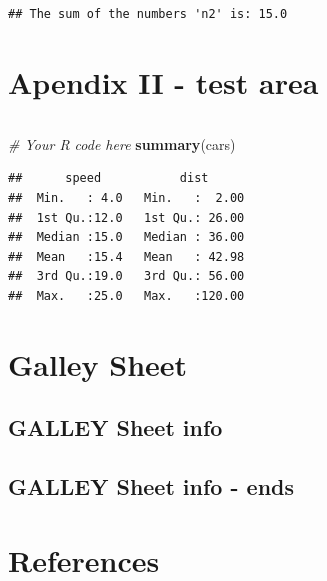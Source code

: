 \documentclass[
  12 pt,
  a4paper,
]{book}
\newenvironment{Shaded}{\begin{snugshade}}{\end{snugshade}}
\newcommand{\CommentTok}[1]{\textcolor[rgb]{0.56,0.35,0.01}{\textit{#1}}}
\newcommand{\FunctionTok}[1]{\textcolor[rgb]{0.13,0.29,0.53}{\textbf{#1}}}
\newcommand{\NormalTok}[1]{#1}
\numberwithin{equation}{section}
\theoremstyle{plain}      %
\theoremstyle{definition} %
\theoremstyle{remark}     %
\theoremstyle{note}         %
\begin{document}
\begin{verbatim}
## The sum of the numbers 'n2' is: 15.0
\end{verbatim}

\newpage

\hypertarget{apendix-ii---test-area}{%
\chapter{Apendix II - test area}\label{apendix-ii---test-area}}

\renewcommand{\lstlistlistingname}{Code Block Listings}

\begin{lstlisting}[caption={Test Code Block Listing}, label={lst:Tst_Listing}]
\end{lstlisting}
\scriptsize

\begin{Shaded}
\begin{Highlighting}[]
\CommentTok{\# Your R code here}
\FunctionTok{summary}\NormalTok{(cars)}
\end{Highlighting}
\end{Shaded}

\begin{verbatim}
##      speed           dist       
##  Min.   : 4.0   Min.   :  2.00  
##  1st Qu.:12.0   1st Qu.: 26.00  
##  Median :15.0   Median : 36.00  
##  Mean   :15.4   Mean   : 42.98  
##  3rd Qu.:19.0   3rd Qu.: 56.00  
##  Max.   :25.0   Max.   :120.00
\end{verbatim}

\normalsize

\listoffigures

\lstlistoflistings

\hypertarget{galley-sheet}{%
\chapter*{Galley Sheet}\label{galley-sheet}}

\hypertarget{galley-sheet-info}{%
\section{\texorpdfstring{\textbf{GALLEY Sheet
info}}{GALLEY Sheet info}}\label{galley-sheet-info}}

\layout

\hypertarget{galley-sheet-info---ends}{%
\section{\texorpdfstring{\textbf{GALLEY Sheet info -
ends}}{GALLEY Sheet info - ends}}\label{galley-sheet-info---ends}}

\newpage

\hypertarget{references}{%
\chapter{References}\label{references}}

\backmatter
\end{document}
